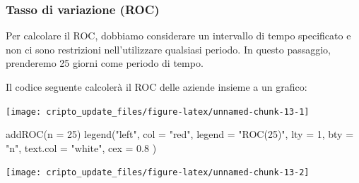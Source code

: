 \documentclass[]{tufte-handout}
\newenvironment{Shaded}{}{}
\newcommand{\AttributeTok}[1]{\textcolor[rgb]{0.49,0.56,0.16}{#1}}
\newcommand{\CommentTok}[1]{\textcolor[rgb]{0.38,0.63,0.69}{\textit{#1}}}
\newcommand{\DecValTok}[1]{\textcolor[rgb]{0.25,0.63,0.44}{#1}}
\newcommand{\FloatTok}[1]{\textcolor[rgb]{0.25,0.63,0.44}{#1}}
\newcommand{\FunctionTok}[1]{\textcolor[rgb]{0.02,0.16,0.49}{#1}}
\newcommand{\NormalTok}[1]{#1}
\newcommand{\OtherTok}[1]{\textcolor[rgb]{0.00,0.44,0.13}{#1}}
\newcommand{\SpecialCharTok}[1]{\textcolor[rgb]{0.25,0.44,0.63}{#1}}
\newcommand{\StringTok}[1]{\textcolor[rgb]{0.25,0.44,0.63}{#1}}
\begin{document}
\hypertarget{tasso-di-variazione-roc}{%
\subsubsection{Tasso di variazione
(ROC)}\label{tasso-di-variazione-roc}}

Per calcolare il ROC, dobbiamo considerare un intervallo di tempo
specificato e non ci sono restrizioni nell'utilizzare qualsiasi periodo.
In questo passaggio, prenderemo 25 giorni come periodo di tempo.

Il codice seguente calcolerà il ROC delle aziende insieme a un grafico:

\begin{Shaded}
\end{Shaded}

\texttt{[image: cripto\_update\_files/figure-latex/unnamed-chunk-13-1]}

\begin{Shaded}
\begin{Highlighting}[]
\FunctionTok{addROC}\NormalTok{(}\AttributeTok{n =} \DecValTok{25}\NormalTok{)}
\FunctionTok{legend}\NormalTok{(}\StringTok{"left"}\NormalTok{,}
  \AttributeTok{col =} \StringTok{"red"}\NormalTok{, }\AttributeTok{legend =} \StringTok{"ROC(25)"}\NormalTok{, }\AttributeTok{lty =} \DecValTok{1}\NormalTok{, }\AttributeTok{bty =} \StringTok{"n"}\NormalTok{,}
  \AttributeTok{text.col =} \StringTok{"white"}\NormalTok{, }\AttributeTok{cex =} \FloatTok{0.8}
\NormalTok{)}
\end{Highlighting}
\end{Shaded}

\texttt{[image: cripto\_update\_files/figure-latex/unnamed-chunk-13-2]}

\begin{Shaded}
\end{Shaded}
\end{document}
